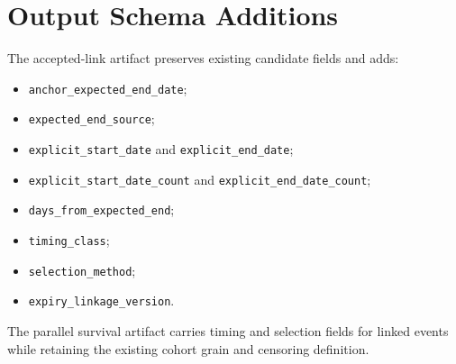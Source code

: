 \documentclass[11pt,a4paper]{article}
\newcommand{\code}[1]{\texttt{\small #1}}
\begin{document}
\section{Output Schema Additions}

The accepted-link artifact preserves existing candidate fields and adds:

\begin{itemize}
  \item \code{anchor\_expected\_end\_date};
  \item \code{expected\_end\_source};
  \item \code{explicit\_start\_date} and \code{explicit\_end\_date};
  \item \code{explicit\_start\_date\_count} and \code{explicit\_end\_date\_count};
  \item \code{days\_from\_expected\_end};
  \item \code{timing\_class};
  \item \code{selection\_method};
  \item \code{expiry\_linkage\_version}.
\end{itemize}

The parallel survival artifact carries timing and selection fields for linked events
while retaining the existing cohort grain and censoring definition.
\end{document}
